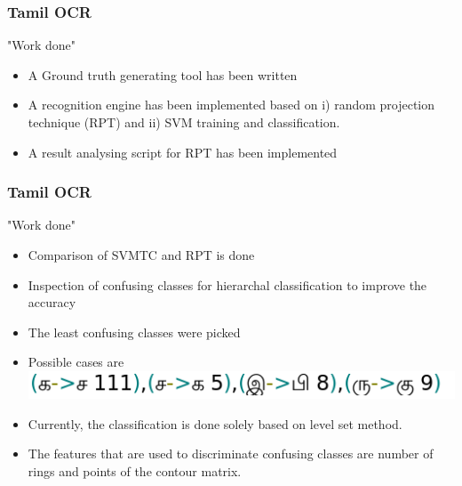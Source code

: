 \documentclass{beamer}
\begin{document}
\begin{frame}
  \frametitle{Tamil OCR}
  "Work done"
          \begin{itemize}
  \item A Ground truth generating tool has been written
  \item A recognition engine has been implemented based on i) random projection technique (RPT) and ii) SVM training and classification.
  \item A result analysing script for RPT has been implemented
          \end{itemize}
\end{frame}


\begin{frame}
  \frametitle{Tamil OCR}
  "Work done"
        \begin{itemize}
	\item Comparison of SVMTC and RPT is done
  \item Inspection of confusing classes for hierarchal classification to improve the accuracy
  \item The least confusing classes were picked

  \item Possible cases are
  \includegraphics[scale=0.4]{./img/conf} 
  \item Currently, the classification is done solely based on level set method.
  \item The features that are used to discriminate confusing classes are number of rings and points of the contour matrix.
        \end{itemize}
\end{frame}
\end{document}
